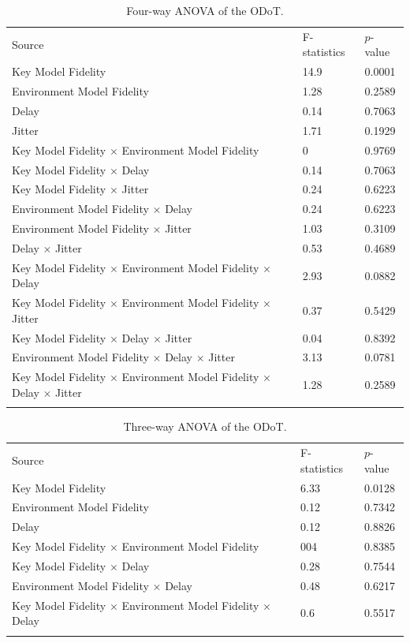 \begin{table}[!htbp]
\caption{Four-way ANOVA of the ODoT.}
\label{tab:fau}
\begin{tabular}{lll}
\hline\noalign{\smallskip}
Source & F-statistics & $p$-value \\
\noalign{\smallskip}\hline\noalign{\smallskip}
Key Model Fidelity & 14.9 & 0.0001 \\
Environment Model Fidelity & 1.28 & 0.2589 \\
Delay & 0.14 & 0.7063 \\
Jitter & 1.71 & 0.1929 \\
Key Model Fidelity $\times$ Environment Model Fidelity & 0 & 0.9769 \\
Key Model Fidelity $\times$ Delay & 0.14 & 0.7063 \\
Key Model Fidelity $\times$ Jitter & 0.24 & 0.6223 \\
Environment Model Fidelity $\times$ Delay & 0.24 & 0.6223 \\
Environment Model Fidelity $\times$ Jitter & 1.03 & 0.3109 \\
Delay $\times$ Jitter & 0.53 & 0.4689 \\
Key Model Fidelity $\times$ Environment Model Fidelity $\times$ Delay & 2.93 & 0.0882 \\
Key Model Fidelity $\times$ Environment Model Fidelity $\times$ Jitter & 0.37 & 0.5429 \\
Key Model Fidelity $\times$ Delay $\times$ Jitter & 0.04 & 0.8392 \\
Environment Model Fidelity $\times$ Delay $\times$ Jitter & 3.13 & 0.0781 \\
Key Model Fidelity $\times$ Environment Model Fidelity $\times$ Delay $\times$ Jitter & 1.28 & 0.2589 \\
\noalign{\smallskip}\hline
\end{tabular}
\end{table}

\begin{table}[!htbp]
\caption{Three-way ANOVA of the ODoT.}
\label{tab:tau}
\begin{tabular}{lll}
\hline\noalign{\smallskip}
Source & F-statistics & $p$-value \\
\noalign{\smallskip}\hline\noalign{\smallskip}
Key Model Fidelity & 6.33 & 0.0128 \\
Environment Model Fidelity & 0.12 & 0.7342 \\
Delay & 0.12 & 0.8826 \\
Key Model Fidelity $\times$ Environment Model Fidelity & 004 & 0.8385 \\
Key Model Fidelity $\times$ Delay & 0.28 & 0.7544 \\
Environment Model Fidelity $\times$ Delay & 0.48 & 0.6217 \\
Key Model Fidelity $\times$ Environment Model Fidelity $\times$ Delay & 0.6 & 0.5517 \\
\noalign{\smallskip}\hline
\end{tabular}
\end{table}

